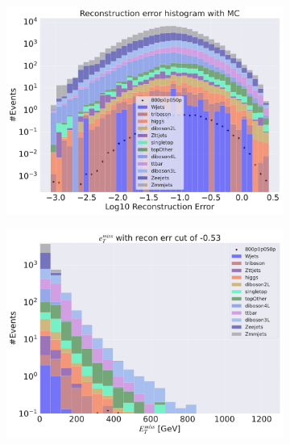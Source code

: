 \begin{figure}[H]
    \centering
    \begin{subfigure}{.40\textwidth}
        \includegraphics[width=\textwidth]{Figures/VAE_testing/big/3lep/b_data_recon_big_rm3_feats_sig_800p0p050p.pdf}
        \caption{ }
        \label{fig:VAE_3lep_big_800_3}
    \end{subfigure}
    \hfill
    \begin{subfigure}{.40\textwidth}
        \includegraphics[width=\textwidth]{Figures/VAE_testing/big/3lep/b_data_recon_big_rm3_feats_sig_800p0p050p_etmiss_recon_errcut_-0.53.pdf}
        \caption{}
        \label{fig:VAE_3lep_big_etmiss_800_3}
    \end{subfigure}

\end{figure}
